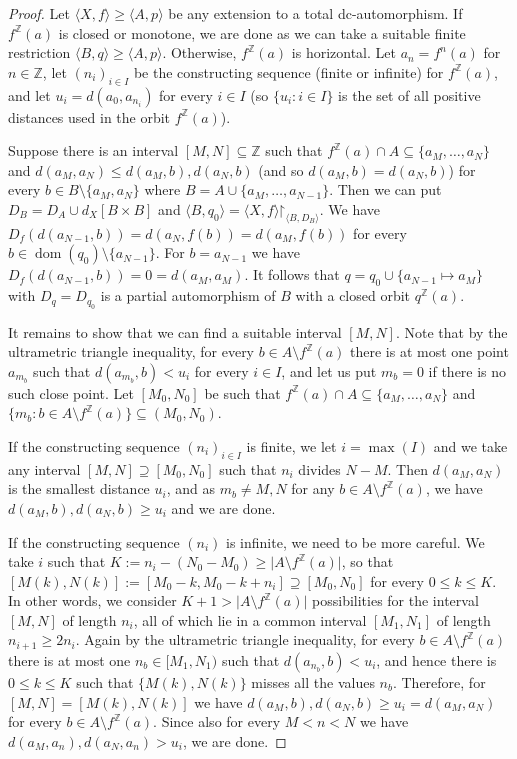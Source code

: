 \documentclass[10pt,a4paper]{article}
\theoremstyle{definition}
\theoremstyle{remark}
\newcommand \set [1]{\{#1\}}
\newcommand \seq [1]{\langle #1 \rangle}
\newcommand \im [1]{[#1]} %
\newcommand \restr [1] {\mathord{\upharpoonright}_{#1}}
\newcommand \dom {\operatorname{dom}}
\newcommand \subs {\subseteq}
\newcommand \card [1] {\lvert#1\rvert} %
\newcommand \Z {\mathbb{Z}}
\begin{document}
\begin{proof}
    Let $\seq{X, f} \geq \seq{A, p}$ be any extension to a total dc-automorphism.
    If $f^\Z(a)$ is closed or monotone, we are done as we can take a suitable finite restriction $\seq{B, q} \geq \seq{A, p}$.
    Otherwise, $f^\Z(a)$ is horizontal.
    Let $a_n = f^n(a)$ for $n \in \Z$, let $(n_i)_{i \in I}$ be the constructing sequence (finite or infinite) for $f^\Z(a)$, and let $u_i = d(a_0, a_{n_i})$ for every $i \in I$ (so $\set{u_i: i \in I}$ is the set of all positive distances used in the orbit $f^\Z(a)$).

    Suppose there is an interval $[M, N] \subs \Z$ such that $f^\Z(a) \cap A \subs \set{a_M, \ldots, a_N}$ and $d(a_M, a_N) \leq d(a_M, b), d(a_N, b)$ (and so $d(a_M, b) = d(a_N, b)$) for every $b \in B \setminus \set{a_M, a_N}$ where $B = A \cup \set{a_M, \ldots, a_{N - 1}}$.
    Then we can put $D_B = D_A \cup d_X\im{B \times B}$ and $\seq{B, q_0} = \seq{X, f}\restr{\seq{B, D_B}}$.
    We have $D_f(d(a_{N - 1}, b)) = d(a_N, f(b)) = d(a_M, f(b))$ for every $b \in \dom(q_0) \setminus \set{a_{N - 1}}$.
    For $b = a_{N - 1}$ we have $D_f(d(a_{N - 1}, b)) = 0 = d(a_M, a_M)$.
    It follows that $q = q_0 \cup \set{a_{N - 1} \mapsto a_M}$ with $D_q = D_{q_0}$ is a partial automorphism of $B$ with a closed orbit $q^\Z(a)$.

    It remains to show that we can find a suitable interval $[M, N]$.
    Note that by the ultrametric triangle inequality, for every $b \in A \setminus f^\Z(a)$ there is at most one point $a_{m_b}$ such that $d(a_{m_b}, b) < u_i$ for every $i \in I$, and let us put $m_b = 0$ if there is no such close point.
    Let $[M_0, N_0]$ be such that $f^\Z(a) \cap A \subs \set{a_M, \ldots, a_N}$ and $\set{m_b: b \in A \setminus f^\Z(a)} \subs (M_0, N_0)$.
    
    If the constructing sequence $(n_i)_{i \in I}$ is finite, we let $i = \max(I)$ and we take any interval $[M, N] \supseteq [M_0, N_0]$ such that $n_i$ divides $N - M$.
    Then $d(a_M, a_N)$ is the smallest distance $u_i$, and as $m_b \neq M, N$ for any $b \in A \setminus f^\Z(a)$, we have $d(a_M, b), d(a_N, b) \geq u_i$ and we are done.

    If the constructing sequence $(n_i)$ is infinite, we need to be more careful.
    We take $i$ such that $K := n_i - (N_0 - M_0) \geq \card{A \setminus f^\Z(a)}$, so that $[M(k), N(k)] := [M_0 - k, M_0 - k + n_i] \supseteq [M_0, N_0]$ for every $0 \leq k \leq K$.
    In other words, we consider $K + 1 > \card{A \setminus f^\Z(a)}$ possibilities for the interval $[M, N]$ of length $n_i$, all of which lie in a common interval $[M_1, N_1]$ of length $n_{i + 1} \geq 2n_i$.
    Again by the ultrametric triangle inequality, for every $b \in A \setminus f^\Z(a)$ there is at most one $n_b \in [M_1, N_1)$ such that $d(a_{n_b}, b) < u_i$, and hence there is $0 \leq k \leq K$ such that $\set{M(k), N(k)}$ misses all the values $n_b$.
    Therefore, for $[M, N] = [M(k), N(k)]$ we have $d(a_M, b), d(a_N, b) \geq u_i = d(a_M, a_N)$ for every $b \in A \setminus f^\Z(a)$.
    Since also for every $M < n < N$ we have $d(a_M, a_n), d(a_N, a_n) > u_i$, we are done.
\end{proof}
\end{document}
